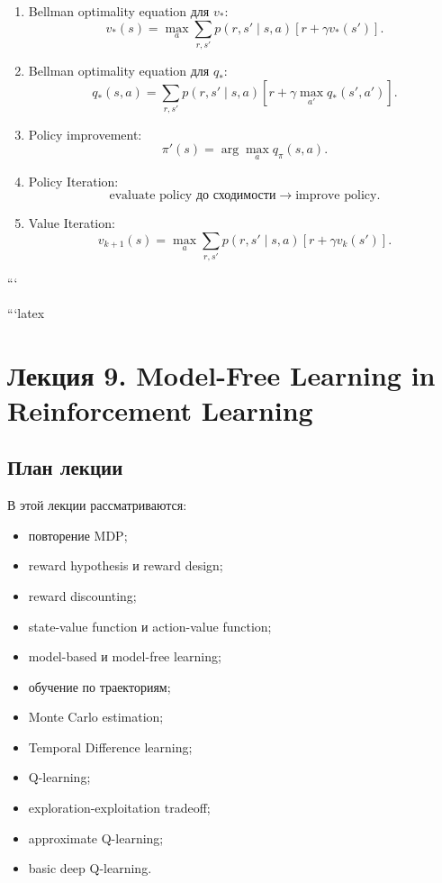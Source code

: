 \documentclass[a4paper,12pt]{article}
\begin{document}
\begin{enumerate}
    \item Bellman optimality equation для \(v_*\):
    \[
    v_*(s)
    =
    \max_a
    \sum_{r,s'}
    p(r,s'\mid s,a)
    [
    r+\gamma v_*(s')
    ].
    \]

    \item Bellman optimality equation для \(q_*\):
    \[
    q_*(s,a)
    =
    \sum_{r,s'}
    p(r,s'\mid s,a)
    \left[
    r+
    \gamma
    \max_{a'}q_*(s',a')
    \right].
    \]

    \item Policy improvement:
    \[
    \pi'(s)=\arg\max_a q_\pi(s,a).
    \]

    \item Policy Iteration:
    \[
    \text{evaluate policy до сходимости}
    \rightarrow
    \text{improve policy}.
    \]

    \item Value Iteration:
    \[
    v_{k+1}(s)
    =
    \max_a
    \sum_{r,s'}
    p(r,s'\mid s,a)
    [
    r+\gamma v_k(s')
    ].
    \]
\end{enumerate}
```


```latex
\section{Лекция 9. Model-Free Learning in Reinforcement Learning}

\subsection{План лекции}

В этой лекции рассматриваются:

\begin{itemize}
    \item повторение MDP;
    \item reward hypothesis и reward design;
    \item reward discounting;
    \item state-value function и action-value function;
    \item model-based и model-free learning;
    \item обучение по траекториям;
    \item Monte Carlo estimation;
    \item Temporal Difference learning;
    \item Q-learning;
    \item exploration-exploitation tradeoff;
    \item approximate Q-learning;
    \item basic deep Q-learning.
\end{itemize}
\end{document}
